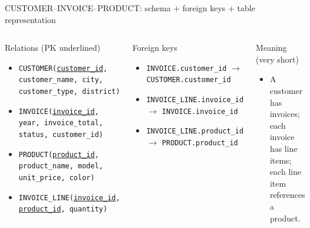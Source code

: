 \documentclass[10pt,aspectratio=169]{beamer}
\begin{document}
\begin{frame}{CUSTOMER--INVOICE--PRODUCT: schema + foreign keys + table representation}

\begin{columns}[T,onlytextwidth]
{\tiny
\setlength{\parskip}{0pt}
\setlength{\itemsep}{1pt}

\begin{block}{Relations (PK underlined)}
\begin{itemize}
  \item \texttt{CUSTOMER(}\underline{\texttt{customer\_id}}\texttt{, customer\_name, city, customer\_type, district)}
  \item \texttt{INVOICE(}\underline{\texttt{invoice\_id}}\texttt{, year, invoice\_total, status, customer\_id)}
  \item \texttt{PRODUCT(}\underline{\texttt{product\_id}}\texttt{, product\_name, model, unit\_price, color)}
  \item \texttt{INVOICE\_LINE(}\underline{\texttt{invoice\_id}}\texttt{, }\underline{\texttt{product\_id}}\texttt{, quantity)}
\end{itemize}
\end{block}

\vspace{-1mm}
\begin{block}{Foreign keys}
\begin{itemize}
  \item \texttt{INVOICE.customer\_id} $\rightarrow$ \texttt{CUSTOMER.customer\_id}
  \item \texttt{INVOICE\_LINE.invoice\_id} $\rightarrow$ \texttt{INVOICE.invoice\_id}
  \item \texttt{INVOICE\_LINE.product\_id} $\rightarrow$ \texttt{PRODUCT.product\_id}
\end{itemize}
\end{block}

\vspace{-1mm}
\begin{block}{Meaning (very short)}
\begin{itemize}
  \item A customer has invoices; each invoice has line items; each line item references a product.
\end{itemize}
\end{block}
}

\centering

\begin{tikzpicture}[scale=0.58, transform shape]


\end{tikzpicture}
\end{columns}
\end{frame}
\end{document}
